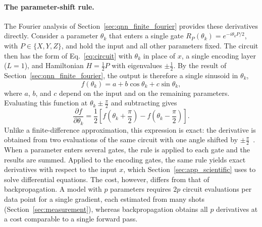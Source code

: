 \documentclass[12pt]{article}
\numberwithin{equation}{section}  %
\begin{document}
\paragraph{The parameter-shift rule.} The Fourier analysis of Section~\ref{sec:qnn_finite_fourier} provides these derivatives directly. Consider a parameter $\theta_k$ that enters a single gate $R_P(\theta_k) = e^{-i\theta_k P/2}$, with $P \in \{X, Y, Z\}$, and hold the input and all other parameters fixed. The circuit then has the form of Eq.~\eqref{eq:circuit} with $\theta_k$ in place of $x$, a single encoding layer ($L = 1$), and Hamiltonian $H = \frac{1}{2}P$ with eigenvalues $\pm\frac{1}{2}$. By the result of Section~\ref{sec:qnn_finite_fourier}, the output is therefore a single sinusoid in $\theta_k$,
\begin{equation}
f(\theta_k) = a + b\cos\theta_k + c\sin\theta_k,
\end{equation}
where $a$, $b$, and $c$ depend on the input and on the remaining parameters. Evaluating this function at $\theta_k \pm \frac{\pi}{2}$ and subtracting gives
\begin{equation}
\frac{\partial f}{\partial \theta_k} = \frac{1}{2}\left[ f\!\left(\theta_k + \frac{\pi}{2}\right) - f\!\left(\theta_k - \frac{\pi}{2}\right) \right].
\label{eq:parameter_shift}
\end{equation}
Unlike a finite-difference approximation, this expression is exact: the derivative is obtained from two evaluations of the same circuit with one angle shifted by $\pm\frac{\pi}{2}$~\cite{mitarai2018quantum, schuld2019evaluating}. When a parameter enters several gates, the rule is applied to each gate and the results are summed. Applied to the encoding gates, the same rule yields exact derivatives with respect to the input $x$, which Section~\ref{sec:app_scientific} uses to solve differential equations. The cost, however, differs from that of backpropagation. A model with $p$ parameters requires $2p$ circuit evaluations per data point for a single gradient, each estimated from many shots (Section~\ref{sec:measurement}), whereas backpropagation obtains all $p$ derivatives at a cost comparable to a single forward pass.
\end{document}

